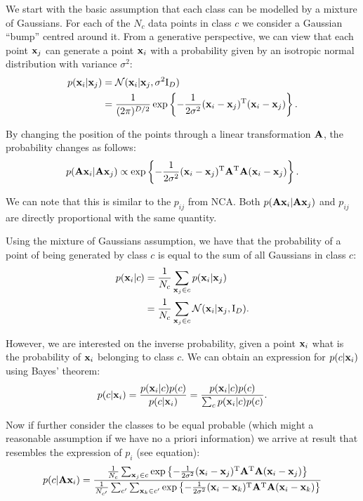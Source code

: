 We start with the basic assumption that each class can be modelled by a mixture of Gaussians. For each of the $N_c$ data points in class $c$ we consider a Gaussian ``bump'' centred around it. From a generative perspective, we can view that each point $\mathbf{x}_j$ can generate a point $\mathbf{x}_i$ with a probability given by an isotropic normal distribution with variance $\sigma^2$:
\begin{align}
	p(\mathbf{x}_i|\mathbf{x}_j) &= \mathcal{N}(\mathbf{x}_i|\mathbf{x}_j, \sigma^2\mathrm{I}_D) \\
				   &= \frac{1}{(2\pi)^{D/2}}\exp \left\{-\frac{1}{2\sigma^2} (\mathbf{x}_i - \mathbf{x}_j)^\mathrm{T}(\mathbf{x}_i - \mathbf{x}_j)\right\}.
\end{align}

By changing the position of the points through a linear transformation $\mathbf{A}$, the probability changes as follows:
\begin{align}
	p(\mathbf{A}\mathbf{x}_i|\mathbf{A}\mathbf{x}_j) \propto \exp \left\{-\frac{1}{2\sigma^2} (\mathbf{x}_i - \mathbf{x}_j)^\mathrm{T}\mathbf{A}^\mathrm{T}\mathbf{A}(\mathbf{x}_i - \mathbf{x}_j)\right\}.
\end{align}

We can note that this is similar to the $p_{ij}$ from NCA. Both $p(\mathbf{A}\mathbf{x}_i|\mathbf{A}\mathbf{x}_j)$ and $p_{ij}$ are directly proportional with the same quantity.

Using the mixture of Gaussians assumption, we have that the probability of a point of being generated by class $c$ is equal to the sum of all Gaussians in class $c$:
\begin{align}
	p(\mathbf{x}_i|c) &= \frac{1}{N_c}\sum_{\mathbf{x}_j \in c} p(\mathbf{x}_i|\mathbf{x}_j)\\
			   &= \frac{1}{N_c}\sum_{\mathbf{x}_j \in c} \mathcal{N}(\mathbf{x}_i|\mathbf{x}_j, \mathrm{I}_D).
\end{align}

However, we are interested on the inverse probability, given a point $\mathbf{x}_i$ what is the probability of $\mathbf{x}_i$ belonging to class $c$. We can obtain an expression for $p(c|\mathbf{x}_i)$ using Bayes' theorem:
\begin{align}
	p(c|\mathbf{x}_i) = \frac{p(\mathbf{x}_i|c)p(c)}{p(c|\mathbf{x}_i)} = \frac{p(\mathbf{x}_i|c)p(c)}{\sum_{c} p(\mathbf{x}_i|c)p(c)}.
	\label{eq:nca-cc-kde-bayes}
\end{align}

Now if further consider the classes to be equal probable (which might a reasonable assumption if we have no a priori information) we arrive at result that resembles the expression of $p_i$ (see equation):
\begin{align}
	p(c|\mathbf{A}\mathbf{x}_i) = \frac{
				\frac{1}{N_c}\sum_{\mathbf{x}_j \in c}\exp\left\{-\frac{1}{2\sigma^2}(\mathbf{x}_i - \mathbf{x}_j)^\mathrm{T}\mathbf{A}^\mathrm{T}\mathbf{A}(\mathbf{x}_i - \mathbf{x}_j)\right\}
				}
				{
				\frac{1}{N_{c'}}\sum_{c'} \sum_{\mathbf{x}_k \in c'}\exp\left\{-\frac{1}{2\sigma^2}(\mathbf{x}_i - \mathbf{x}_k)^\mathrm{T}\mathbf{A}^\mathrm{T}\mathbf{A}(\mathbf{x}_i - \mathbf{x}_k)\right\} 
				}
\end{align}

